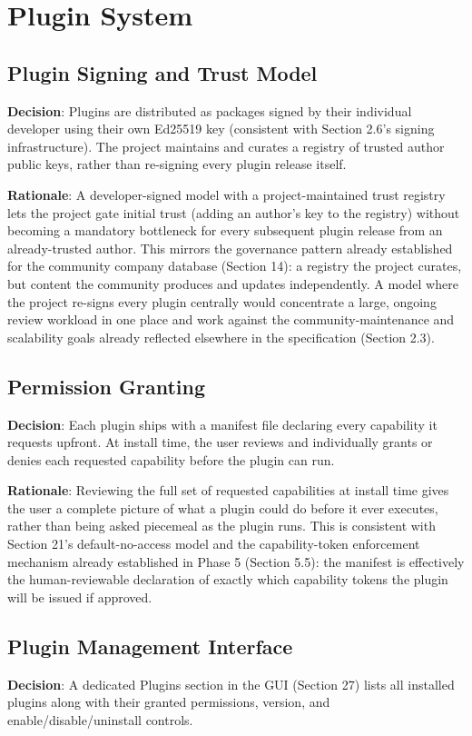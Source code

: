 \chapter{Plugin System}

\section{Plugin Signing and Trust Model}
\textbf{Decision}: Plugins are distributed as packages signed by their individual developer using their own Ed25519 key (consistent with Section 2.6's signing infrastructure). The project maintains and curates a registry of trusted author public keys, rather than re-signing every plugin release itself.

\textbf{Rationale}: A developer-signed model with a project-maintained trust registry lets the project gate initial trust (adding an author's key to the registry) without becoming a mandatory bottleneck for every subsequent plugin release from an already-trusted author. This mirrors the governance pattern already established for the community company database (Section 14): a registry the project curates, but content the community produces and updates independently. A model where the project re-signs every plugin centrally would concentrate a large, ongoing review workload in one place and work against the community-maintenance and scalability goals already reflected elsewhere in the specification (Section 2.3).
\section{Permission Granting}
\textbf{Decision}: Each plugin ships with a manifest file declaring every capability it requests upfront. At install time, the user reviews and individually grants or denies each requested capability before the plugin can run.

\textbf{Rationale}: Reviewing the full set of requested capabilities at install time gives the user a complete picture of what a plugin could do before it ever executes, rather than being asked piecemeal as the plugin runs. This is consistent with Section 21's default-no-access model and the capability-token enforcement mechanism already established in Phase 5 (Section 5.5): the manifest is effectively the human-reviewable declaration of exactly which capability tokens the plugin will be issued if approved.
\section{Plugin Management Interface}
\textbf{Decision}: A dedicated Plugins section in the GUI (Section 27) lists all installed plugins along with their granted permissions, version, and enable/disable/uninstall controls.

